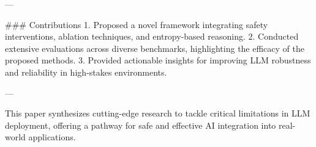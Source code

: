 ---

### Contributions  
1. Proposed a novel framework integrating safety interventions, ablation techniques, and entropy-based reasoning.  
2. Conducted extensive evaluations across diverse benchmarks, highlighting the efficacy of the proposed methods.  
3. Provided actionable insights for improving LLM robustness and reliability in high-stakes environments.  

--- 

This paper synthesizes cutting-edge research to tackle critical limitations in LLM deployment, offering a pathway for safe and effective AI integration into real-world applications.